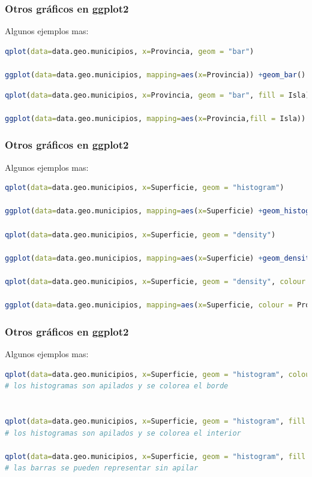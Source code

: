 \documentclass[8pt,ignorenonframetext,]{beamer}
\begin{document}
\begin{frame}[fragile]\frametitle{Otros gráficos en ggplot2}

Algunos ejemplos mas:

\begin{lstlisting}[language=R]
qplot(data=data.geo.municipios, x=Provincia, geom = "bar")

ggplot(data=data.geo.municipios, mapping=aes(x=Provincia)) +geom_bar()
\end{lstlisting}

\begin{lstlisting}[language=R]
qplot(data=data.geo.municipios, x=Provincia, geom = "bar", fill = Isla)

ggplot(data=data.geo.municipios, mapping=aes(x=Provincia,fill = Isla)) +geom_bar()
\end{lstlisting}

\end{frame}

\begin{frame}[fragile]\frametitle{Otros gráficos en ggplot2}

Algunos ejemplos mas:

\begin{lstlisting}[language=R]
qplot(data=data.geo.municipios, x=Superficie, geom = "histogram")

ggplot(data=data.geo.municipios, mapping=aes(x=Superficie) +geom_histogram()

qplot(data=data.geo.municipios, x=Superficie, geom = "density")

ggplot(data=data.geo.municipios, mapping=aes(x=Superficie) +geom_density()
       
qplot(data=data.geo.municipios, x=Superficie, geom = "density", colour = Provincia)   # las densidades son superpuestas

ggplot(data=data.geo.municipios, mapping=aes(x=Superficie, colour = Provincia)) +geom_density()
\end{lstlisting}

\end{frame}

\begin{frame}[fragile]\frametitle{Otros gráficos en ggplot2}

Algunos ejemplos mas:

\begin{lstlisting}[language=R]
qplot(data=data.geo.municipios, x=Superficie, geom = "histogram", colour = Provincia)  
# los histogramas son apilados y se colorea el borde
       
       
qplot(data=data.geo.municipios, x=Superficie, geom = "histogram", fill = Provincia)  
# los histogramas son apilados y se colorea el interior

qplot(data=data.geo.municipios, x=Superficie, geom = "histogram", fill = Provincia, position="dodge")  
# las barras se pueden representar sin apilar
       
\end{lstlisting}

\end{frame}
\end{document}
